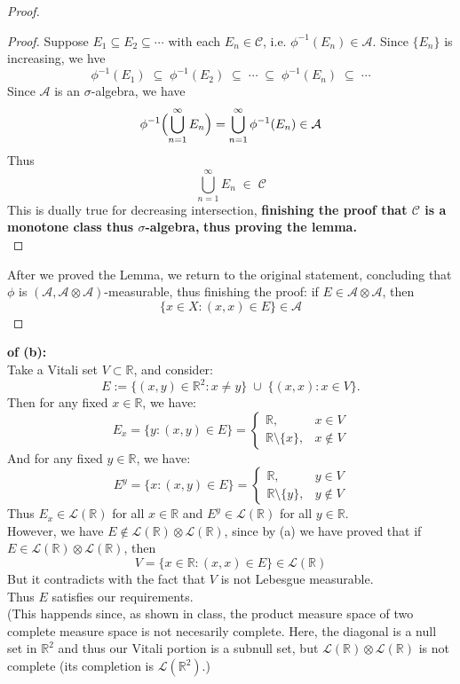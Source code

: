 \documentclass[lang=cn,11pt]{elegantbook}
\begin{document}
\begin{proof}
\begin{proof}
Suppose \(E_1 \subseteq E_2 \subseteq \cdots\) with each \(E_n \in \mathcal{C}\), i.e. $\phi^{-1}(E_n) \in \mathcal{A}$.
Since \(\{E_n\}\) is increasing, we hve
\[
  \phi^{-1}(E_1) \;\subseteq\; \phi^{-1}(E_2) \;\subseteq\; \cdots \;\subseteq\; \phi^{-1}(E_n) \;\subseteq\; \cdots
\]
Since \(\mathcal{A}\) is an \(\sigma\)-algebra, we have \[
  \phi^{-1}\Bigl(\bigcup_{n=1}^\infty E_n\Bigr) = 
  \bigcup_{n=1}^\infty \phi^{-1}(E_n) \in\mathcal{A}
\]Thus \[
   \bigcup_{n=1}^\infty E_n \;\in\; \mathcal{C}
\]
This is dually true for decreasing intersection, \textbf{finishing the proof that $\mathcal{C}$ is a monotone class thus $\sigma$-algebra,} \textbf{thus proving the lemma.}\\
\end{proof}
After we proved the Lemma, we return to the original statement, concluding that $\phi$ is $(\mathcal{A},\mathcal{A}\otimes \mathcal{A})$-measurable, thus finishing the proof: if $E\in\mathcal{A}\otimes\mathcal{A}$, then  \[
      \{ x\in X: (x,x)\in E\} \in \mathcal{A}
    \]
\end{proof}



\begin{solution}
    \textbf{of (b):}\\
Take a Vitali set $V \subset \mathbb{R}$, and consider:
\[
  E := \{(x,y) \in \mathbb{R}^2 : x \neq y\}
         \;\cup\;
         \{(x,x) : x \in V\}.
\]
Then for any fixed $x \in \mathbb{R}$, we have: \[
  E_x  = \bigl\{y : (x,y)\in E\bigr\} = 
    \begin{cases}
      \mathbb{R}, & x \in V \\
      \mathbb{R}\setminus\{x\}, & x \notin V
    \end{cases}
\]
And for any fixed $y \in \mathbb{R}$, we have: \[
  E^y =  \bigl\{x : (x,y)\in E\bigr\} = 
    \begin{cases}
      \mathbb{R}, & y \in V \\
      \mathbb{R}\setminus\{y\}, & y \notin V
    \end{cases}
\]Thus $E_x\in \mathcal{L}(\mathbb{R})$ for all $x\in \mathbb{R}$ and $E^y\in \mathcal{L}(\mathbb{R})$ for all $y\in \mathbb{R}$.\\
However, we have $E\notin \mathcal{L}(\mathbb{R})\otimes  \mathcal{L}(\mathbb{R})$, since by (a) we have proved that if $E\in \mathcal{L}(\mathbb{R})\otimes  \mathcal{L}(\mathbb{R})$, then \[
  V =     \{ x\in \mathbb{R}: (x,x)\in E\} \in \mathcal{L}(\mathbb{R})
    \]
But it contradicts with the fact that $V$ is not Lebesgue measurable.\\
Thus $E$ satisfies our requirements.\\
(This happends since, as shown in class, the product measure space of two complete measure space is not necesarily complete. Here, the diagonal is a null set in $\mathbb{R}^2$ and thus our Vitali portion is a subnull set, but $\mathcal{L}(\mathbb{R})\otimes \mathcal{L}(\mathbb{R})$ is not complete (its completion is $\mathcal{L}(\mathbb{R}^2)$.)
\end{solution}
\end{document}

